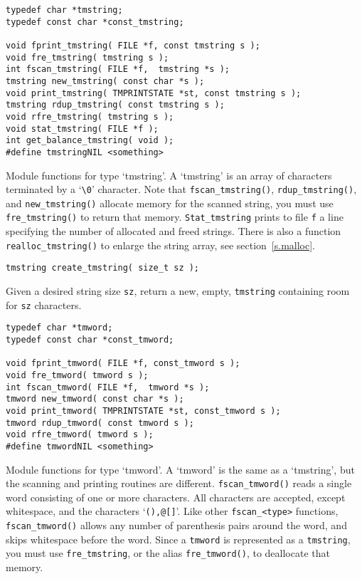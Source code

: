\begin{verbatim}
typedef char *tmstring;
typedef const char *const_tmstring;

void fprint_tmstring( FILE *f, const tmstring s );
void fre_tmstring( tmstring s );
int fscan_tmstring( FILE *f,  tmstring *s );
tmstring new_tmstring( const char *s );
void print_tmstring( TMPRINTSTATE *st, const tmstring s );
tmstring rdup_tmstring( const tmstring s );
void rfre_tmstring( tmstring s );
void stat_tmstring( FILE *f );
int get_balance_tmstring( void );
#define tmstringNIL <something>
\end{verbatim}
\begin{desc}
Module functions for type `tmstring'.
A `tmstring' is an array of characters terminated by a `\verb+\0+' character.
Note that {\tt fscan\_tmstring()}, {\tt rdup\_tmstring()},
and {\tt new\_tmstring()} allocate memory for the scanned string,
you must use {\tt fre\_tmstring()} to return that memory.
{\tt Stat\_tmstring} prints to file {\tt f} a line specifying the number of
allocated and freed strings.
There is also a function \verb+realloc_tmstring()+ to enlarge the
string array,
see section~\ref{s.malloc}.
\end{desc}
\begin{verbatim}
tmstring create_tmstring( size_t sz );
\end{verbatim}
\begin{desc}
Given a desired string size \verb'sz', return a new, empty, {\tt tmstring}
containing room for \verb'sz' characters.
\end{desc}
\begin{verbatim}
typedef char *tmword;
typedef const char *const_tmword;

void fprint_tmword( FILE *f, const_tmword s );
void fre_tmword( tmword s );
int fscan_tmword( FILE *f,  tmword *s );
tmword new_tmword( const char *s );
void print_tmword( TMPRINTSTATE *st, const_tmword s );
tmword rdup_tmword( const tmword s );
void rfre_tmword( tmword s );
#define tmwordNIL <something>
\end{verbatim}
\begin{desc}
Module functions for type `tmword'.
A `tmword' is the same as a `tmstring', but the scanning and printing
routines are different. \verb'fscan_tmword()' reads a single word
consisting of one or more characters. All characters are accepted,
except whitespace, and the characters `\verb'(),@[]''.
Like other \verb'fscan_<type>' functions, \verb'fscan_tmword()' allows
any number of parenthesis pairs around the word, and skips
whitespace before the word.
Since a \verb'tmword' is represented as a \verb'tmstring',
you must use \verb'fre_tmstring', or the alias {\tt fre\_tmword()},
to deallocate that memory.
\end{desc}
